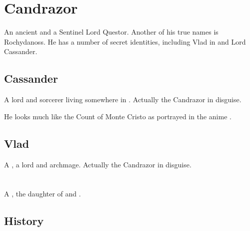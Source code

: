 \section{Candrazor}
An ancient \dragon{} and a Sentinel Lord Questor. 
Another of his true names is Rochydanoss. 
He has a number of secret identities, including Vlad \Ceskav{} in \Zarwec{} and Lord Cassander. 










\subsection{Cassander}
A \human{} lord and sorcerer living somewhere in \Velcad{}. Actually the \dragon{} Candrazor in disguise. 

He looks much like the Count of Monte Cristo as portrayed in the anime \cite{Anime:Gankutsuou}. 









\subsection[Vlad Ceskav]{Vlad \Ceskav}
A \scatha, a \Zarweci{} lord and archmage. Actually the \dragon{} Candrazor in disguise.















\section[Cryocas Nzessuacrith]{\CryocasNzessuacrith}
\index{\CryocasNzessuacrith}
\index{\Nzessuacrith}
A \dragon, the daughter of \QuessanthIshnaruchaefir and \AeocrithRystessakhin.









\subsection{History}





